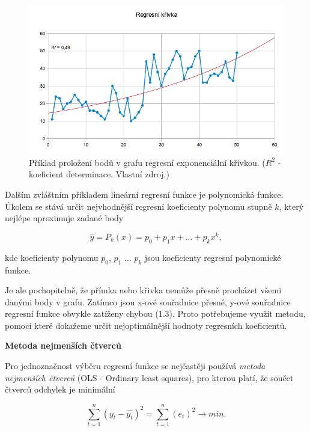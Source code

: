 \documentclass[a4paper,12pt,twoside]{scrreprt}
\begin{document}
\begin{figure}[h]
  \centering
  \includegraphics[width=15cm]{pictures/krivka.png}
  \caption{Příklad proložení bodů v grafu regresní exponenciální křivkou. \newline($R^2$ - koeficient determinace. Vlastní zdroj.)}
  \label{fig:křivka}
\end{figure}

Dalším zvláštním příkladem lineární regresní funkce je polynomická funkce. Úkolem se stává určit nejvhodnější regresní koeficienty polynomu stupně $k$, který nejlépe aproximuje zadané body

\begin{equation}
\hat{y} = P_k(x) = p_0 + p_1x + ... + p_kx^k,
\end{equation} 

kde koeficienty polynomu $p_0$, $p_1$ ... $p_k$ jsou koeficienty regresní polynomické funkce. 

Je ale pochopitelně, že přímka nebo křivka nemůže přesně procházet všemi danými body v grafu. Zatímco jsou x-ové souřadnice přesné, y-ové souřadnice regresní funkce obvykle zatíženy chybou (1.3). Proto potřebujeme využít metodu, pomocí které dokažeme určit nejoptimálnější hodnoty regresních koeficientů. 

\normalsize\textbf{\newline Metoda nejmenších čtverců}

Pro jednoznačnost výběru regresní funkce se nejčastěji používá \textit{metoda nejmenších čtverců} (OLS - Ordinary least squares), pro kterou platí, že součet čtverců odchylek je minimální

\begin{equation}
\sum_{t=1}^{n}(y_t - \hat{y_t})^2 = \sum_{t=1}^{n}(e_t)^2 \rightarrow min. 
\end{equation}
\end{document}

